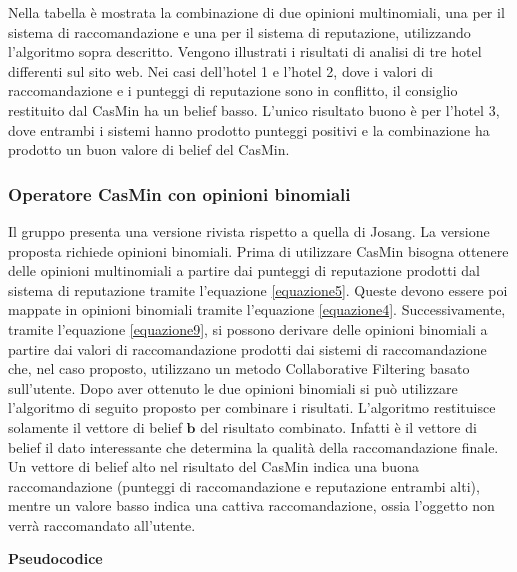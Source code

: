 \documentclass[letterpaper]{article} %
\begin{document}
Nella tabella
è mostrata la combinazione di due opinioni multinomiali, una per il
sistema di raccomandazione e una per il sistema di reputazione,
utilizzando l'algoritmo sopra descritto. Vengono illustrati i risultati
di analisi di tre hotel differenti sul sito web. Nei casi dell'hotel 1 e
l'hotel 2, dove i valori di raccomandazione e i punteggi di reputazione
sono in conflitto, il consiglio restituito dal CasMin ha un belief
basso. L'unico risultato buono è per l'hotel 3, dove entrambi i sistemi
hanno prodotto punteggi positivi e la combinazione ha prodotto un buon
valore di belief del CasMin.

\hypertarget{header-n192}{%
	\subsubsection{Operatore CasMin con opinioni
		binomiali}\label{header-n192}}

Il gruppo presenta una versione rivista rispetto a quella di Josang. La
versione proposta richiede opinioni binomiali. Prima di utilizzare
CasMin bisogna ottenere delle opinioni multinomiali a partire dai punteggi
di reputazione prodotti dal sistema di reputazione tramite l'equazione \eqref{equazione5}. Queste devono essere poi
mappate in opinioni binomiali tramite l'equazione \eqref{equazione4}. Successivamente, tramite l'equazione \eqref{equazione9},
si possono derivare delle opinioni binomiali a partire dai valori di raccomandazione prodotti dai sistemi di raccomandazione
che, nel caso proposto, utilizzano un metodo Collaborative Filtering
basato sull'utente. Dopo aver ottenuto le due
opinioni binomiali si può utilizzare l'algoritmo di seguito proposto per
combinare i risultati. L'algoritmo restituisce solamente il vettore di
belief $\textbf{b}$ del risultato combinato. Infatti è il vettore di
belief il dato interessante che determina la qualità della
raccomandazione finale. Un vettore di belief alto nel risultato del CasMin indica una
buona raccomandazione (punteggi di raccomandazione e reputazione entrambi alti),
mentre un valore basso indica una cattiva raccomandazione, ossia
l'oggetto non verrà raccomandato all'utente.

\textbf{Pseudocodice}
\end{document}
